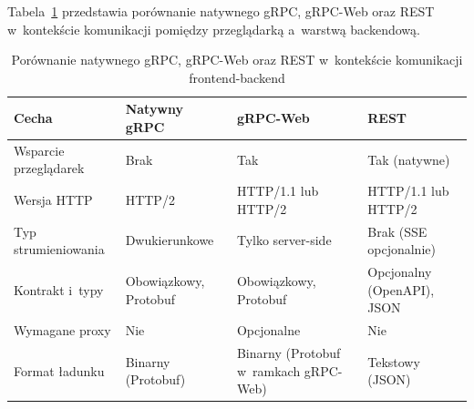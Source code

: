 Tabela~\ref{tab:gRPCComparison} przedstawia porównanie natywnego gRPC, gRPC-Web oraz REST w~kontekście komunikacji pomiędzy przeglądarką a~warstwą backendową.

\begin{table}[htb]

\begin{center}

\caption{Porównanie natywnego gRPC, gRPC-Web oraz REST w~kontekście komunikacji frontend-backend}

\label{tab:gRPCComparison}

\footnotesize

\begin{tabular}{|l|>{\raggedright\arraybackslash}p{3cm}|>{\raggedright\arraybackslash}p{3cm}|>{\raggedright\arraybackslash}p{3cm}|}

\hline

\textbf{Cecha} & \textbf{Natywny gRPC} & \textbf{gRPC-Web} & \textbf{REST} \\

\hline

Wsparcie przeglądarek & Brak & Tak & Tak (natywne) \\

\hline

Wersja HTTP & HTTP/2 & HTTP/1.1 lub HTTP/2 & HTTP/1.1 lub HTTP/2 \\

\hline

Typ strumieniowania & Dwukierunkowe & Tylko server-side & Brak (SSE opcjonalnie) \\

\hline

Kontrakt i~typy & Obowiązkowy, Protobuf & Obowiązkowy, Protobuf & Opcjonalny (OpenAPI), JSON \\

\hline

Wymagane proxy & Nie & Opcjonalne & Nie \\

\hline

Format ładunku & Binarny (Protobuf) & Binarny (Protobuf w~ramkach gRPC-Web) & Tekstowy (JSON) \\

\hline

\end{tabular}

\end{center}

\end{table}


